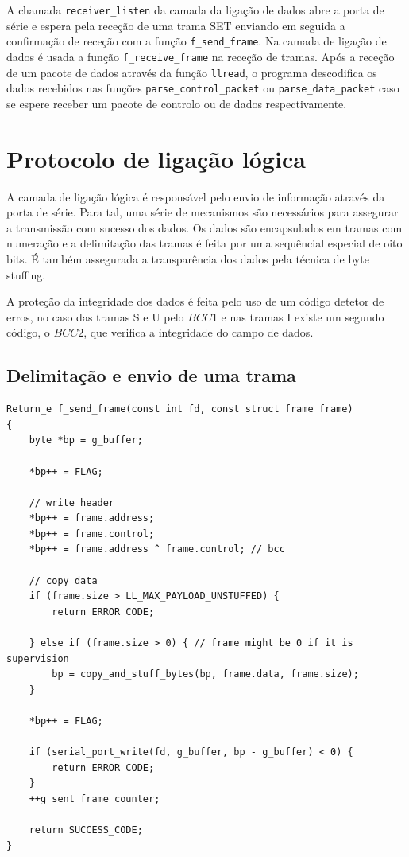 \documentclass[a4paper,11pt,titlepage]{article}
\begin{document}
A chamada \texttt{receiver\_listen} da camada da ligação de dados abre a porta de série e espera pela receção de uma trama SET enviando em seguida a confirmação de receção com a função \texttt{f\_send\_frame}. Na camada de ligação de dados é usada a função \texttt{f\_receive\_frame} na receção de tramas. Após a receção de um pacote de dados através da função \texttt{llread}, o programa descodifica os dados recebidos nas funções \texttt{parse\_control\_packet} ou \texttt{parse\_data\_packet} caso se espere receber um pacote de controlo ou de dados respectivamente.

\section{Protocolo de ligação lógica}

A camada de ligação lógica é responsável pelo envio de informação através da porta de série. Para tal, uma série de mecanismos são necessários para assegurar a transmissão com sucesso dos dados. Os dados são encapsulados em tramas com numeração e a delimitação das tramas é feita por uma sequêncial especial de oito bits.
É também assegurada a transparência dos dados pela técnica de byte stuffing.

A proteção da integridade dos dados é feita  pelo uso de um código detetor de erros, no caso das tramas S e U pelo $BCC1$ e nas tramas I existe um segundo código, o $BCC2$, que verifica a integridade do campo de dados.

\subsection*{Delimitação e envio de uma trama}

\begin{lstlisting}[style=customc]
Return_e f_send_frame(const int fd, const struct frame frame)
{
	byte *bp = g_buffer;

	*bp++ = FLAG;

	// write header
	*bp++ = frame.address;
	*bp++ = frame.control;
	*bp++ = frame.address ^ frame.control; // bcc

	// copy data
	if (frame.size > LL_MAX_PAYLOAD_UNSTUFFED) {
		return ERROR_CODE;

	} else if (frame.size > 0) { // frame might be 0 if it is supervision
		bp = copy_and_stuff_bytes(bp, frame.data, frame.size);
	}

	*bp++ = FLAG;

	if (serial_port_write(fd, g_buffer, bp - g_buffer) < 0) {
		return ERROR_CODE;
	}
	++g_sent_frame_counter;

	return SUCCESS_CODE;
}
\end{lstlisting}
\end{document}
